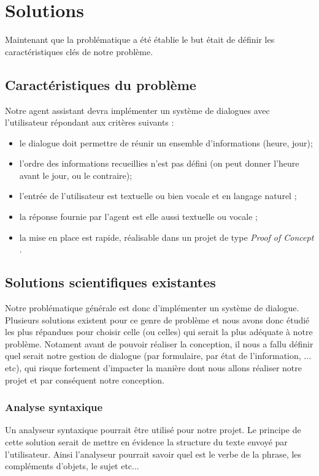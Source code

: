 \chapter{Solutions}

Maintenant que la problématique a été établie le but était de définir les caractéristiques clés de notre problème.


\section{Caractéristiques du problème}
Notre agent assistant devra implémenter un système de dialogues avec l'utilisateur répondant aux critères suivants :
\begin{itemize}
	\item le dialogue doit permettre de réunir un ensemble d'informations (heure, jour);
 	\item l'ordre des informations recueillies n'est pas défini (on peut donner l'heure avant le jour, ou le contraire);
 	\item l'entrée de l'utilisateur est textuelle ou bien vocale et en langage naturel ;
 	\item la réponse fournie par l'agent est elle aussi textuelle ou vocale ;
 	\item la mise en place est rapide, réalisable dans un projet de type \og \textit{Proof of Concept} \fg.
\end{itemize}

\section{Solutions scientifiques existantes}
Notre problématique générale est donc d'implémenter un système de dialogue. Plusieurs solutions existent pour ce genre de problème et nous avons donc étudié les plus répandues pour choisir celle (ou celles) qui serait la plus adéquate à notre problème. Notament avant de pouvoir réaliser la conception, il nous a fallu définir quel serait notre gestion de dialogue (par formulaire, par état de l'information, ... etc), qui risque fortement d'impacter la manière dont nous allons réaliser notre projet et par conséquent notre conception.

\subsection{Analyse syntaxique}
Un analyseur syntaxique pourrait être utilisé pour notre projet. Le principe de cette solution serait de mettre en évidence la structure du texte envoyé par l'utilisateur. Ainsi l'analyseur pourrait savoir quel est le verbe de la phrase, les compléments d'objets, le sujet etc... 

